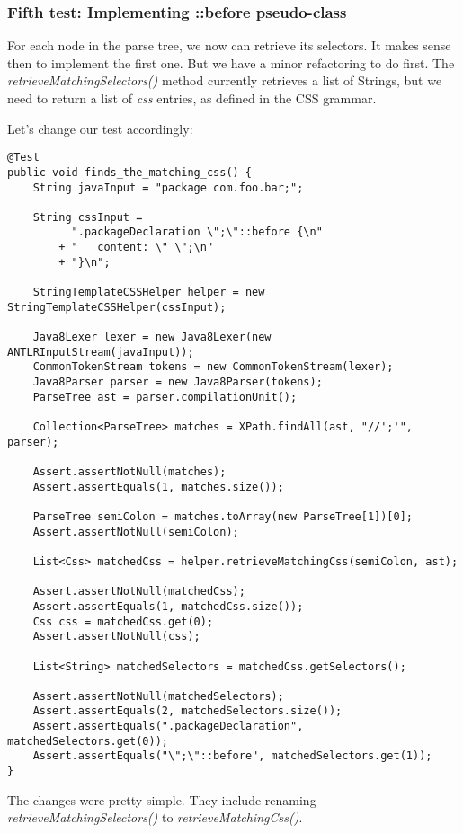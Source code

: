 \documentclass[11pt]{article}
\begin{document}
\subsubsection{Fifth test: Implementing ::before pseudo-class}
\label{sec-1-4-6}

For each node in the parse tree, we now can retrieve its selectors. It makes sense then to implement the first one.
But we have a minor refactoring to do first. The \emph{retrieveMatchingSelectors()} method currently retrieves a list of
Strings, but we need to return a list of \emph{css} entries, as defined in the CSS grammar.

Let's change our test accordingly:

\begin{verbatim}
@Test
public void finds_the_matching_css() {
    String javaInput = "package com.foo.bar;";

    String cssInput =
          ".packageDeclaration \";\"::before {\n"
        + "   content: \" \";\n"
        + "}\n";

    StringTemplateCSSHelper helper = new StringTemplateCSSHelper(cssInput);

    Java8Lexer lexer = new Java8Lexer(new ANTLRInputStream(javaInput));
    CommonTokenStream tokens = new CommonTokenStream(lexer);
    Java8Parser parser = new Java8Parser(tokens);
    ParseTree ast = parser.compilationUnit();

    Collection<ParseTree> matches = XPath.findAll(ast, "//';'", parser);

    Assert.assertNotNull(matches);
    Assert.assertEquals(1, matches.size());

    ParseTree semiColon = matches.toArray(new ParseTree[1])[0];
    Assert.assertNotNull(semiColon);

    List<Css> matchedCss = helper.retrieveMatchingCss(semiColon, ast);

    Assert.assertNotNull(matchedCss);
    Assert.assertEquals(1, matchedCss.size());
    Css css = matchedCss.get(0);
    Assert.assertNotNull(css);

    List<String> matchedSelectors = matchedCss.getSelectors();

    Assert.assertNotNull(matchedSelectors);
    Assert.assertEquals(2, matchedSelectors.size());
    Assert.assertEquals(".packageDeclaration", matchedSelectors.get(0));
    Assert.assertEquals("\";\"::before", matchedSelectors.get(1));
}
\end{verbatim}

The changes were pretty simple. They include renaming \emph{retrieveMatchingSelectors()} to \emph{retrieveMatchingCss()}.
\end{document}
